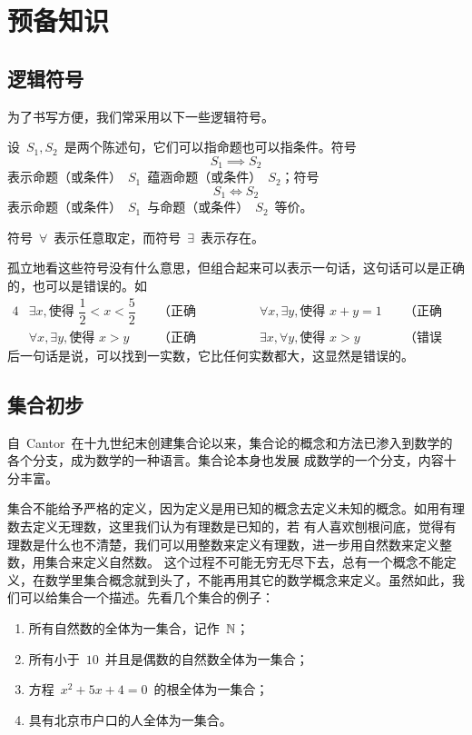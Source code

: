 

\chapter{预备知识}\label{ch:0}

\section{逻辑符号}

为了书写方便，我们常采用以下一些逻辑符号。

设~$S_1,S_2$~是两个陈述句，它们可以指命题也可以指条件。符号
\[
  S_1\implies S_2
\]
表示命题（或条件）~$S_1$~蕴涵命题（或条件）~$S_2$；符号
\[
  S_1\iff S_2
\]
表示命题（或条件）~$S_1$~与命题（或条件）~$S_2$~等价。

符号~$\forall$~表示任意取定，而符号~$\exists$~表示存在。

孤立地看这些符号没有什么意思，但组合起来可以表示一句话，这句话可以是正确的，也可以是错误的。如
\begin{alignat*}{4}
&\exists x,\text{使得~}\dfrac 12<x<\dfrac 52 &\enspace&\text{（正确的）；}
&\qquad&\forall x,\exists y,\text{使得~}x+y=1 &\enspace&\text{（正确的）；}\\
&\forall x,\exists y,\text{使得~}x>y & &\text{（正确的）；}
&\qquad&\exists x,\forall y,\text{使得~}x>y & &\text{（错误的）。}
\end{alignat*}
后一句话是说，可以找到一实数，它比任何实数都大，这显然是错误的。

\section{集合初步}

自~Cantor~在十九世纪末创建集合论以来，集合论的概念和方法已渗入到数学的各个分支，成为数学的一种语言。集合论本身也发展
成数学的一个分支，内容十分丰富。

集合不能给予严格的定义，因为定义是用已知的概念去定义未知的概念。如用有理数去定义无理数，这里我们认为有理数是已知的，若
有人喜欢刨根问底，觉得有理数是什么也不清楚，我们可以用整数来定义有理数，进一步用自然数来定义整数，用集合来定义自然数。%
这个过程不可能无穷无尽下去，总有一个概念不能定义，在数学里集合概念就到头了，不能再用其它的数学概念来定义。虽然如此，我
们可以给集合一个描述。先看几个集合的例子：

\begin{enumerate}
\item 所有自然数的全体为一集合，记作~$\mathbb{N}$；\label{enum:set1}
\item 所有小于~$10$~并且是偶数的自然数全体为一集合；\label{enum:set2}
\item 方程~$x^2+5x+4=0$~的根全体为一集合；\label{enum:set3}
\item 具有北京市户口的人全体为一集合。\label{enum:set4}
\end{enumerate}

